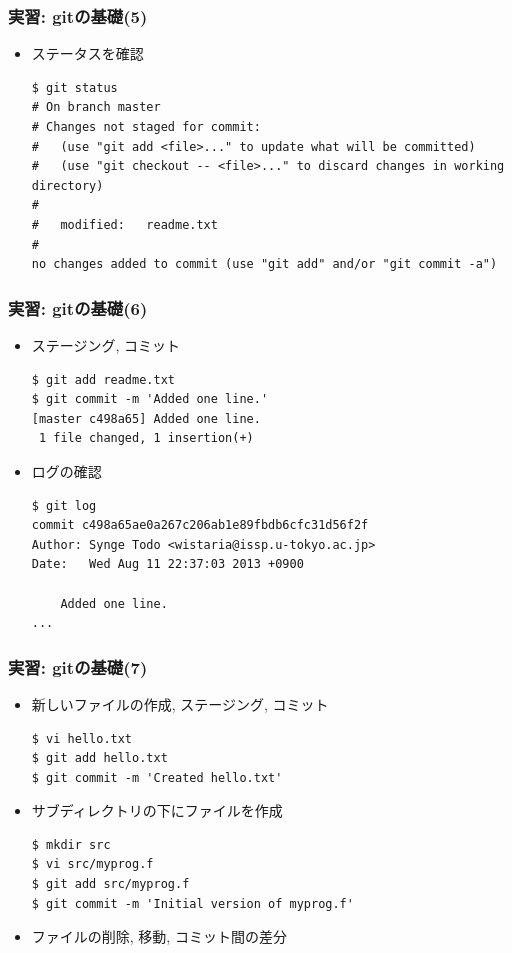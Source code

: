\begin{frame}[t,fragile]
  \frametitle{実習: gitの基礎(5)}
  \begin{itemize}
  \item ステータスを確認
\begin{lstlisting}
$ git status
# On branch master
# Changes not staged for commit:
#   (use "git add <file>..." to update what will be committed)
#   (use "git checkout -- <file>..." to discard changes in working directory)
#
#	modified:   readme.txt
#
no changes added to commit (use "git add" and/or "git commit -a")
\end{lstlisting}
  \end{itemize}
\end{frame}

\begin{frame}[t,fragile]
  \frametitle{実習: gitの基礎(6)}
  \begin{itemize}
  \item ステージング, コミット
\begin{lstlisting}
$ git add readme.txt
$ git commit -m 'Added one line.'
[master c498a65] Added one line.
 1 file changed, 1 insertion(+)
\end{lstlisting}
  \item ログの確認
\begin{lstlisting}
$ git log
commit c498a65ae0a267c206ab1e89fbdb6cfc31d56f2f
Author: Synge Todo <wistaria@issp.u-tokyo.ac.jp>
Date:   Wed Aug 11 22:37:03 2013 +0900

    Added one line.
...
\end{lstlisting}
  \end{itemize}
\end{frame}

\begin{frame}[t,fragile]
  \frametitle{実習: gitの基礎(7)}
  \begin{itemize}
  \item 新しいファイルの作成, ステージング, コミット
\begin{lstlisting}
$ vi hello.txt
$ git add hello.txt
$ git commit -m 'Created hello.txt'
\end{lstlisting}
  \item サブディレクトリの下にファイルを作成
\begin{lstlisting}
$ mkdir src
$ vi src/myprog.f
$ git add src/myprog.f
$ git commit -m 'Initial version of myprog.f'
\end{lstlisting}
  \item ファイルの削除, 移動, コミット間の差分
  \end{itemize}
\end{frame}

